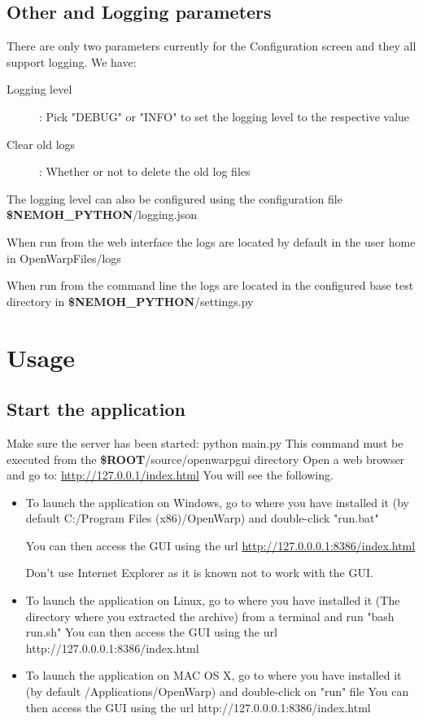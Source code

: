 \documentclass[12pt]{article}
\newcommand{\ROOT}{{\textbf{\$ROOT}}}
\newcommand{\NEMOHPYTHON}{{\textbf{\$NEMOH{\_}PYTHON}}}
\begin{document}
\subsection{Other and Logging parameters}

There are only two parameters currently for the Configuration screen and they all support logging. We have:

\begin{description}
	\item [Logging level]:  Pick "DEBUG" or "INFO" to set the logging level to the respective value
	
	\item [Clear old logs]: Whether or not to delete the old log files
\end{description}

The logging level can also be configured using the configuration file \NEMOHPYTHON{}/logging.json

When run from the web interface the logs are located by default in the user home in OpenWarpFiles/logs

When run from the command line the logs are located in the configured base test directory in 
\NEMOHPYTHON{}/settings.py




\section{Usage}
\label{usage}


\subsection{Start the application}
Make sure the server has been started:
{ \color{blue} python main.py}
This command must be executed from the \ROOT/source/openwarpgui directory
Open a web browser and go to:
\url{http://127.0.0.1/index.html}
You will see the following.

\begin{itemize}
	\item To launch the application on Windows, go to where you have installed it (by default C:/Program Files (x86)/OpenWarp) and double-click "run.bat"
	
	You can then access the GUI using the url \url{http://127.0.0.0.1:8386/index.html}
	
	Don't use Internet Explorer as it is known not to work with the GUI.
	
	
	\item To launch the application on Linux, go to where you have installed it (The directory where you extracted the archive) from a terminal and run "bash run.sh"
	You can then access the GUI using the url http://127.0.0.0.1:8386/index.html
	
	
	\item To launch the application on MAC OS X, go to where you have installed it (by default /Applications/OpenWarp) and double-click on "run" file
	You can then access the GUI using the url http://127.0.0.0.1:8386/index.html
\end{itemize}
\end{document}
